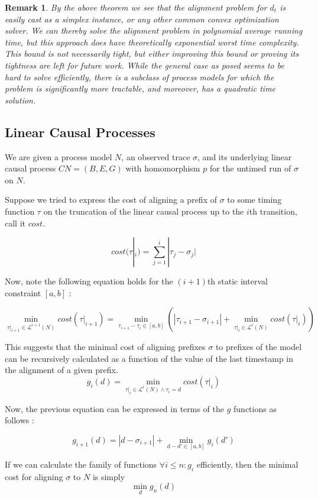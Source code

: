 \documentclass{article}
\newtheorem{remark}{Remark}
\theoremstyle{Definition}
\theoremstyle{definition}
\begin{document}
	\begin{remark}
		By the above theorem we see that the alignment problem for $d_t$ is easily cast as a simplex instance, or any other common convex optimization solver. 
		We can thereby solve the alignment problem in polynomial average running time, but this approach does have theoretically exponential worst time complexity. 
		This bound is not necessarily tight, but either improving this bound or proving its tightness are left for future work. While the general case as posed seems to be hard to solve efficiently, there is a subclass of process models for which the problem is significantly more tractable, and moreover, has a quadratic time solution. 
	\end{remark}
	
	\subsection{Linear Causal Processes} 

We are given a process model $N$, an observed trace $\sigma$, and its underlying linear causal process $CN = (B, E, G)$ with homomorphism $p$ for the untimed run of $\sigma$ on $N$. 

Suppose we tried to express the cost of aligning a prefix of $\sigma$ to some timing function $\tau$ on the truncation of the linear causal process up to the $i$th transition, call it $cost$. 

$$cost(\tau|_i) = \sum_{j = 1}^{i} |\tau_j - \sigma_j|$$

Now, note the following equation holds for the $(i+1)$th static interval constraint $[a, b]$ : 

$$\min_{\tau|_{i+1} \in \mathcal{L}^{i+1}(N)}cost(\tau|_{i+1}) = \min_{\tau_{i+1} - \tau_i\in [a, b]} (|\tau_{i+1} - \sigma_{i+1}| + \min_{\tau|_i \in \mathcal{L}^i(N) }cost(\tau|_i))$$

This suggests that the minimal cost of aligning prefixes $\sigma$ to prefixes of the model can be recursively calculated as a function of the value of the last timestamp in the alignment of a given prefix. 
$$g_i(d) = \min_{\tau|_i \in \mathcal{L}^i(N) \wedge \tau_i = d} cost(\tau|_i)$$

Now, the previous equation can be expressed in terms of the $g$ functions as follows : 

$$g_{i+1}(d) = |d - \sigma_{i+1}| + \min_{d-d' \in [a,b]} g_i(d')$$

If we can calculate the family of functions $\forall i \leq n : g_i$ efficiently, then the minimal cost for aligning $\sigma$ to $N$ is simply $$\min_{d} g_n(d)$$
\end{document}
